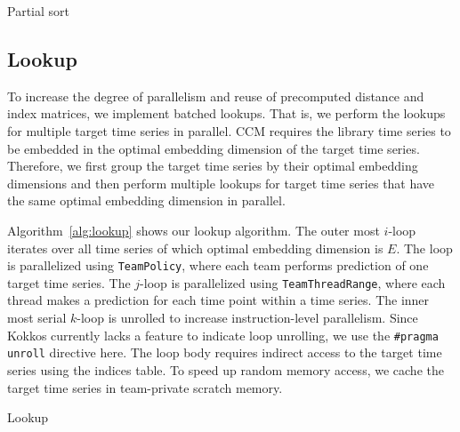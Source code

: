 \documentclass[sigconf]{acmart}
\begin{document}
\begin{algorithm}
    \SetAlgoLined
    \DontPrintSemicolon
    \caption{Partial sort}%
    \label{alg:partial-sort}
\end{algorithm}

\subsection{Lookup}

To increase the degree of parallelism and reuse of precomputed distance and
index matrices, we implement batched lookups. That is, we perform the lookups
for multiple target time series in parallel. CCM requires the library
time series to be embedded in the optimal embedding dimension of the target
time series. Therefore, we first group the target time series by their optimal
embedding dimensions and then perform multiple lookups for target time series that
have the same optimal embedding dimension in parallel.

Algorithm~\ref{alg:lookup} shows our lookup algorithm. The outer most $i$-loop
iterates over all time series of which optimal embedding dimension is $E$. The loop is
parallelized using \texttt{TeamPolicy}, where each team performs prediction of one
target time series. The $j$-loop is parallelized using \texttt{TeamThreadRange},
where each thread makes a prediction for each time point within a time series. The
inner most serial $k$-loop is unrolled to increase instruction-level parallelism. Since Kokkos currently
lacks a feature to indicate loop unrolling, we use the \texttt{\#pragma
unroll} directive here. The loop body requires indirect access to the target
time series using the indices table. To speed up random memory access, we cache the
target time series in team-private scratch memory.

\begin{algorithm}
    \SetAlgoLined
    \DontPrintSemicolon
    \caption{Lookup}%
    \label{alg:lookup}
\end{algorithm}
\end{document}
